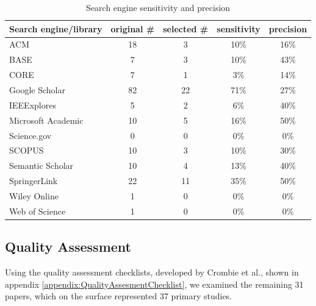 \begin{table}[h]
    \begin{center}
        \begin{tabular}{ | l | c | c | c | c |} 
            \hline
            Search engine/library     & original \# & selected \# & sensitivity & precision\\
            \hline
            \hline
            ACM                        & 18          & 3           & 10\%        &  16\%    \\
            BASE                       & 7           & 3           & 10\%        &  43\%    \\
            CORE                       & 7           & 1           &  3\%        &  14\%    \\
            Google Scholar             & 82          & 22          & 71\%        &  27\%    \\
            IEEExplores                & 5           & 2           &  6\%        &  40\%    \\
            Microsoft Academic         & 10          & 5           & 16\%        &  50\%    \\
            Science.gov                & 0           & 0           &  0\%        &   0\%    \\
            SCOPUS                     & 10          & 3           & 10\%        &  30\%    \\
            Semantic Scholar           & 10          & 4           & 13\%        &  40\%    \\
            SpringerLink               & 22          & 11          & 35\%        &  50\%    \\
            Wiley Online               & 1           & 0           &  0\%        &   0\%    \\
            Web of Science             & 1           & 0           &  0\%        &   0\%    \\
            \hline
        \end{tabular}
    \end{center}
    \caption{Search engine sensitivity and precision}
    \label{table:sensitivity_precision}
\end{table}


\subsection{Quality Assessment}
Using the quality assessment checklists, developed by Crombie et al.\cite{crombie1997pocket}, shown in appendix \ref{appendix:QualityAssesmentChecklist}, we examined the remaining 31 papers, which on the surface represented 37 primary studies.


